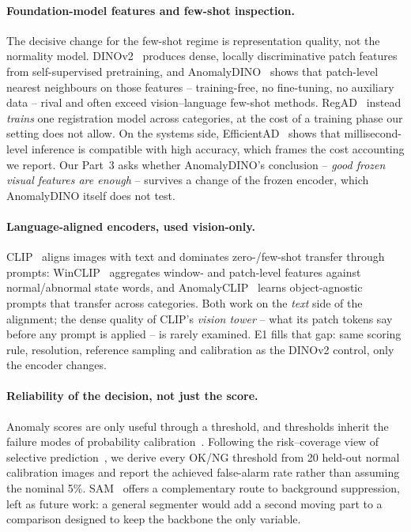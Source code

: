 \paragraph{Foundation-model features and few-shot inspection.}
The decisive change for the few-shot regime is representation quality, not the normality
model. DINOv2~\cite{oquab2024dinov2} produces dense, locally discriminative patch features
from self-supervised pretraining, and AnomalyDINO~\cite{damm2025anomalydino} shows that
patch-level nearest neighbours on those features -- training-free, no fine-tuning, no
auxiliary data -- rival and often exceed vision--language few-shot methods.
RegAD~\cite{huang2022regad} instead \emph{trains} one registration model across categories, at
the cost of a training phase our setting does not allow. On the systems side,
EfficientAD~\cite{batzner2024efficientad} shows that millisecond-level inference is compatible
with high accuracy, which frames the cost accounting we report. Our Part~3 asks whether
AnomalyDINO's conclusion -- \emph{good frozen visual features are enough} -- survives a change
of the frozen encoder, which AnomalyDINO itself does not test.

\paragraph{Language-aligned encoders, used vision-only.}
CLIP~\cite{radford2021clip} aligns images with text and dominates zero-/few-shot transfer
through prompts: WinCLIP~\cite{jeong2023winclip} aggregates window- and patch-level features
against normal/abnormal state words, and AnomalyCLIP~\cite{zhou2024anomalyclip} learns
object-agnostic prompts that transfer across categories. Both work on the \emph{text} side of
the alignment; the dense quality of CLIP's \emph{vision tower} -- what its patch tokens say
before any prompt is applied -- is rarely examined. E1 fills that gap: same scoring rule,
resolution, reference sampling and calibration as the DINOv2 control, only the encoder
changes.

\paragraph{Reliability of the decision, not just the score.}
Anomaly scores are only useful through a threshold, and thresholds inherit the failure modes
of probability calibration~\cite{guo2017calibration}. Following the risk--coverage view of
selective prediction~\cite{geifman2017selective}, we derive every OK/NG threshold from 20
held-out normal calibration images and report the achieved false-alarm rate rather than
assuming the nominal 5\%. SAM~\cite{kirillov2023sam} offers a complementary route to
background suppression, left as future work: a general segmenter would add a second moving
part to a comparison designed to keep the backbone the only variable.

